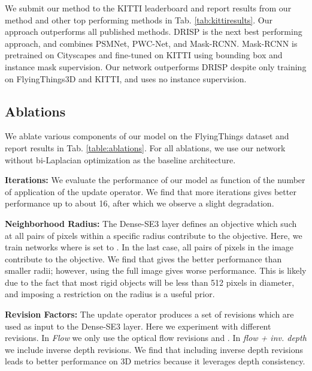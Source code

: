 \documentclass[final]{cvpr}
\begin{document}
We submit our method to the KITTI leaderboard and report results from our method and other top performing methods in Tab. \ref{tab:kittiresults}. Our approach outperforms all published methods. DRISP \cite{ma2019deep} is the next best performing approach, and combines PSMNet\cite{chang2018pyramid}, PWC-Net\cite{pwcnet}, and Mask-RCNN\cite{he2017mask}. Mask-RCNN is pretrained on Cityscapes and fine-tuned on KITTI using bounding box and instance mask supervision. Our network outperforms DRISP despite only training on FlyingThings3D and KITTI, and uses no instance supervision.


\subsection{Ablations}
\label{sec:ablations}

We ablate various components of our model on the FlyingThings dataset and report results in Tab. \ref{table:ablations}. For all ablations, we use our network without bi-Laplacian optimization as the baseline architecture.

\vspace{1mm} \noindent \textbf{Iterations:} We evaluate the performance of our model as function of the number of application of the update operator. We find that more iterations gives better performance up to about 16, after which we observe a slight degradation.

\vspace{1mm} \noindent \textbf{Neighborhood Radius:} The Dense-SE3 layer defines an objective which such at all pairs of pixels within a specific radius  contribute to the objective. Here, we train networks where  is set to . In the last case, all pairs of pixels in the image contribute to the objective. We find that   gives the better performance than smaller radii; however, using the full image gives worse performance. This is likely due to the fact that most rigid objects will be less than 512 pixels in diameter, and imposing a restriction on the radius is a useful prior.

\vspace{1mm} \noindent \textbf{Revision Factors:} The update operator produces a set of revisions which are used as input to the Dense-SE3 layer. Here we experiment with different revisions. In \emph{Flow} we only use the optical flow revisions  and . In \emph{flow + inv. depth} we include inverse depth revisions. We find that including inverse depth revisions leads to better performance on 3D metrics because it leverages depth consistency.
\end{document}
